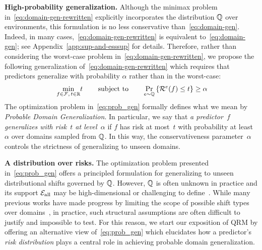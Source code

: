 \documentclass{article}
\begin{document}
\textbf{High-probability generalization.}  Although the minimax problem in~\eqref{eq:domain-gen-rewritten} explicitly incorporates the distribution $\mathbb{Q}$ over environments, this formulation is no less conservative than~\eqref{eq:domain-gen}.  Indeed, 
in many cases,~\eqref{eq:domain-gen-rewritten} is equivalent to~\eqref{eq:domain-gen}; see Appendix~\ref{app:sup-and-esssup} for details.  Therefore, rather than considering the worst-case problem in~\eqref{eq:domain-gen-rewritten}, we propose the following generalization of~\eqref{eq:domain-gen-rewritten} which requires that predictors generalize with probability $\alpha$ rather than in the worst-case:
%
%
\begin{equation}
\begin{alignedat}{2}
\label{eq:prob_gen}
    &\min_{f\in\mathcal{F},\, t \in \mathbb{R}} &&t  \qquad \operatorname*{subject\,\, to \qquad} \Pr_{e\sim\mathbb{Q}} \left\{\mathcal{R}^e(f) \leq t \right\} \geq \alpha
\end{alignedat}
\end{equation}
%
%
%
The optimization problem in~\eqref{eq:prob_gen} formally defines what we mean by
%
%
\textit{Probable Domain Generalization}.
In particular, we say that \textit{a predictor~$f$ generalizes with risk~$t$ at level~$\alpha$} if $f$ has risk at most~$t$ with probability at least~$\alpha$ over domains sampled from $\mathbb{Q}$.
%
%
In this way, the conservativeness parameter~$\alpha$ controls the strictness of generalizing to unseen domains.
%
%
%
%
%
%
%
%
%
%
%
%
%
%
%
%
%
%
%
%
%
%
%




%
%
%
%
%

%

%

%
%
%
%

%
%
%
%
%
%
%



%


\textbf{A distribution over risks.}  The optimization problem presented in~\eqref{eq:prob_gen} offers a principled formulation for generalizing to unseen distributional shifts governed by $\mathbb{Q}$.  However, $\mathbb{Q}$ is often unknown in practice and its support ${\mathcal{E}_\text{all}}$ may be high-dimensional or challenging to define~\cite{robey2021modelbased}. 
%
While 
%
many previous works have made progress by limiting the scope of possible shift types
%
over domains~\cite{eastwood2021source,robey2021modelbased,sagawa2019distributionally}, 
%
in practice, such structural assumptions are often difficult to justify and impossible to test. For this reason, we start our exposition of QRM by offering an alternative view of~\eqref{eq:prob_gen} which elucidates how a predictor's \emph{risk distribution} plays a central role in achieving probable domain generalization.
%
\end{document}
